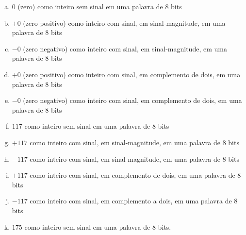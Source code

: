 \documentclass[a4paper,12pt]{article}
\begin{document}
\begin{enumerate}[(a)]
\item $0$ (zero) como inteiro sem sinal em uma palavra de $8$ bits

\bit\bit\bit\bit\bit\bit\bit\bit

\item $+0$ (zero positivo) como inteiro com sinal, em sinal-magnitude, em uma palavra de $8$ bits

\bit\bit\bit\bit\bit\bit\bit\bit

\item $-0$ (zero negativo) como inteiro com sinal, em sinal-magnitude, em uma palavra de $8$ bits

\bit\bit\bit\bit\bit\bit\bit\bit

\item $+0$ (zero positivo) como inteiro com sinal, em complemento de dois, em uma palavra de $8$ bits

\bit\bit\bit\bit\bit\bit\bit\bit

\item $-0$ (zero negativo) como inteiro com sinal, em complemento de dois, em uma palavra de $8$ bits

\bit\bit\bit\bit\bit\bit\bit\bit

\item $117$ como inteiro sem sinal em uma palavra de $8$ bits

\bit\bit\bit\bit\bit\bit\bit\bit

\item $+117$ como inteiro com sinal, em sinal-magnitude, em uma palavra de $8$ bits

\bit\bit\bit\bit\bit\bit\bit\bit

\item $-117$ como inteiro com sinal, em sinal-magnitude, em uma palavra de $8$ bits

\bit\bit\bit\bit\bit\bit\bit\bit

\item $+117$ como inteiro com sinal, em complemento de dois, em uma palavra de $8$ bits

\bit\bit\bit\bit\bit\bit\bit\bit

\item $-117$ como inteiro com sinal, em complemento a dois, em uma palavra de $8$ bits

\bit\bit\bit\bit\bit\bit\bit\bit

\item $175$ como inteiro sem sinal em uma palavra de $8$ bits.


\end{enumerate}
\end{document}
